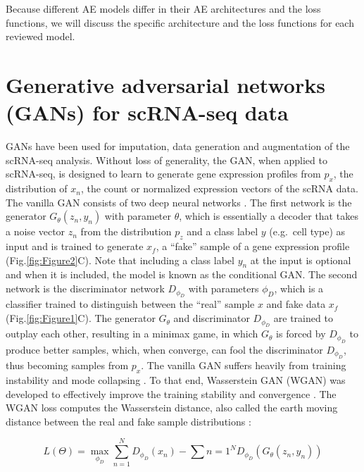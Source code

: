 \documentclass[
]{book}
\begin{document}
Because different AE models differ in their AE architectures and the loss functions, we will discuss the specific architecture and the loss functions for each reviewed model.

\hypertarget{ch-3-3}{%
\section{Generative adversarial networks (GANs) for scRNA-seq data}\label{ch-3-3}}

GANs have been used for imputation, data generation and augmentation of the scRNA-seq analysis. Without loss of generality, the GAN, when applied to scRNA-seq, is designed to learn to generate gene expression profiles from \(p_{x}\), the distribution of \(x_{n}\), the count or normalized expression vectors of the scRNA data. The vanilla GAN consists of two deep neural networks \citep{RN98}. The first network is the generator \(G_{\theta}(z_{n},y_{n})\) with parameter \(\theta\), which is essentially a decoder that takes a noise vector \(z_{n}\) from the distribution \(p_{z}\) and a class label \(y\) (e.g.~cell type) as input and is trained to generate \(x_{f}\), a ``fake'' sample of a gene expression profile (Fig.\ref{fig:Figure2}C). Note that including a class label \(y_{n}\) at the input is optional and when it is included, the model is known as the conditional GAN. The second network is the discriminator network \(D_{\phi_{D}}\) with parameters \(\phi_{D}\), which is a classifier trained to distinguish between the ``real'' sample \(x\) and fake data \(x_{f}\) (Fig.\ref{fig:Figure1}C). The generator \(G_{\theta}\) and discriminator \(D_{\phi_{D}}\) are trained to outplay each other, resulting in a minimax game, in which \(G_{\theta}\) is forced by \(D_{\phi_{D}}\) to produce better samples, which, when converge, can fool the discriminator \(D_{\phi_{D}}\), thus becoming samples from \(p_{x}\). The vanilla GAN suffers heavily from training instability and mode collapsing \citep{RN104}. To that end, Wasserstein GAN (WGAN) was developed to effectively improve the training stability and convergence \citep{RN107}. The WGAN loss computes the Wasserstein distance, also called the earth moving distance between the real and fake sample distributions \citep{RN181}:

\begin{equation}
  L(\Theta)=\max_{\phi_{D}}\sum_{n=1}^{N}D_{\phi_{D}}(x_{n})-\sum{n=1}^{N}D_{\phi_{D}}(G_{\theta}(z_{n},y_{n})) \label{eq:eq10}
\end{equation}
\end{document}
